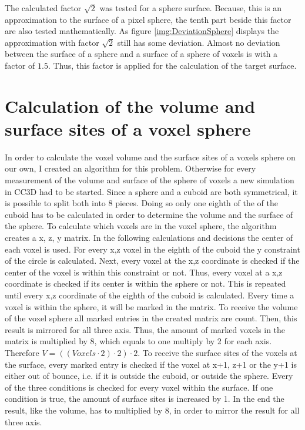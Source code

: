 The calculated factor $\sqrt{2}$ was tested for a sphere surface. Because, this is an approximation to the surface of a pixel sphere, the tenth part beside this factor are also tested mathematically. As figure \ref{img:DeviationSphere} displays the  approximation with factor $\sqrt{2}$ still has some deviation. Almost no deviation between the surface of a sphere and a surface of a sphere of voxels is with a factor of $1.5$. Thus, this factor is applied for the calculation of the target surface. 

\section{Calculation of the volume and surface sites of a voxel sphere}\label{sec:CreatedAlgorithm}
In order to calculate the voxel volume and the surface sites of a voxels sphere on our own, I created an algorithm for this problem. Otherwise for every measurement of the volume and surface of the sphere of voxels a new simulation in \ac{CC3D} had to be started. \newline
Since a sphere and a cuboid are both symmetrical, it is possible to split both into 8 pieces. Doing so only one eighth of the of the cuboid has to be calculated in order to determine the volume and the surface of the sphere. \newline
To calculate which voxels are in the voxel sphere, the algorithm creates a x, z, y matrix. In the following calculations and decisions the center of each voxel is used. For every x,z voxel in the eighth of the cuboid the y constraint of the circle is calculated. Next, every voxel at the x,z coordinate is checked if the center of the voxel is within this constraint or not. Thus, every voxel at a x,z coordinate is checked if its center is within the sphere or not. This is repeated until every x,z coordinate of the eighth of the cuboid is calculated. Every time a voxel is within the sphere, it will be marked in the matrix.  \newline
To receive the volume of the voxel sphere all marked entries in the created matrix are count. Then, this result is mirrored for all three axis. Thus, the amount of marked voxels in the matrix is multiplied by 8, which equals to one multiply by 2 for each axis. Therefore $V=((Voxels \cdot 2) \cdot 2) \cdot 2$.
To receive the surface sites of the voxels at the surface, every marked entry is checked if the voxel at x+1, z+1 or the y+1 is either out of bounce, i.e. if it is outside the cuboid, or outside the sphere. Every of the three conditions is checked for every voxel within the surface. If one condition is true, the amount of surface sites is increased by 1. In the end the result, like the volume, has to multiplied by 8, in order to mirror the result for all three axis.



